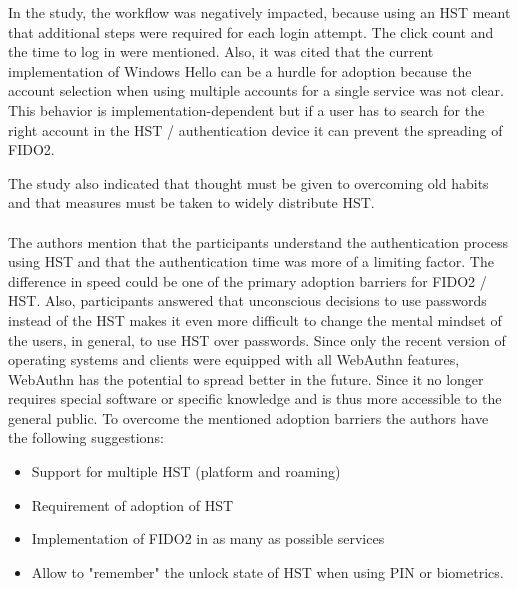 \documentclass[runningheads]{llncs}
\begin{document}
In the study, the workflow was negatively impacted, because using an HST meant that additional steps were required for each login attempt. The click count and the time to log in were mentioned. Also, it was cited that the current implementation of Windows Hello can be a hurdle for adoption because the account selection when using multiple accounts for a single service was not clear. This behavior is implementation-dependent but if a user has to search for the right account in the HST / authentication device it can prevent the spreading of FIDO2. 

The study also indicated that thought must be given to overcoming old habits and that measures must be taken to widely distribute HST.

\paragraph{}
The authors mention that the participants understand the authentication process using HST and that the authentication time was more of a limiting factor. The difference in speed could be one of the primary adoption barriers for FIDO2 / HST. Also, participants answered that unconscious decisions to use passwords instead of the HST makes it even more difficult to change the mental mindset of the users, in general, to use HST over passwords. Since only the recent version of operating systems and clients were equipped with all WebAuthn features, WebAuthn has the potential to spread better in the future. Since it no longer requires special software or specific knowledge and is thus more accessible to the general public. To overcome the mentioned adoption barriers the authors have the following suggestions:
\begin{itemize}
  \item Support for multiple HST (platform and roaming)
  \item Requirement of adoption of HST
  \item Implementation of FIDO2 in as many as possible services
  \item Allow to "remember" the unlock state of HST when using PIN or biometrics.
\end{itemize}
\cite{255646}
\end{document}
